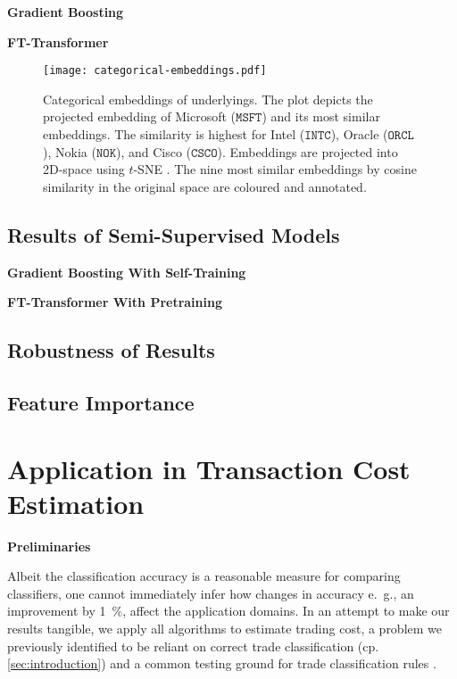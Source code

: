 \textbf{Gradient Boosting}

\textbf{FT-Transformer}

\begin{figure}[ht]
    \centering
    \texttt{[image: categorical-embeddings.pdf]}
    \caption[Categorical Embeddings of Underlyings]{Categorical embeddings of underlyings. The plot depicts the projected embedding of Microsoft ($\mathtt{MSFT}$) and its most similar embeddings. The similarity is highest for Intel ($\mathtt{INTC}$), Oracle ($\mathtt{ORCL}$), Nokia ($\mathtt{NOK}$), and Cisco ($\mathtt{CSCO}$). Embeddings are projected into 2D-space using $t$-SNE \autocite{vandermaatenVisualizingDataUsing2008}. The nine most similar embeddings by cosine similarity in the original space are coloured and annotated.}
    \label{fig:categorical-embeddings}
\end{figure}

\subsection{Results of Semi-Supervised
    Models}\label{sec:results-of-semi-supervised-models}


\textbf{Gradient Boosting With Self-Training}

\textbf{FT-Transformer With Pretraining}

\subsection{Robustness of Results}\label{sec:robustness-checks}

\subsection{Feature Importance}\label{sec:feature-importance}

\newpage
\section{Application in Transaction Cost Estimation}\label{sec:application}

\textbf{Preliminaries}


Albeit the classification accuracy is a reasonable measure for comparing classifiers, one cannot immediately infer how changes in accuracy e.~g., an improvement by \SI{1}{\percent}, affect the application domains. In an attempt to make our results tangible, we apply all algorithms to estimate trading cost, a problem we previously identified to be reliant on correct trade classification (cp. \cref{sec:introduction}) and a common testing ground for trade classification rules \autocites[cp.][541]{ellisAccuracyTradeClassification2000}[][569]{finucaneDirectTestMethods2000}[][271--278]{petersonEvaluationBiasesExecution2003}[][896--897]{savickasInferringDirectionOption2003}.

